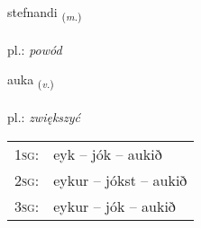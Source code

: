 \documentclass[frontgrid, backgrid]{flacards}\usepackage[]{graphicx}\usepackage[]{xcolor}
\begin{document}
{stefnandi \small{\textsubscript{(\textit{m.})}} \\[1ex] %
\textphonetic{[stɛpnantɪ]} \\
pl.: \emph{powód} \\  [2ex]
\renewcommand*{\arraystretch}{0.8}
}

\renewcommand{\flhead}{\vskip5pt \fboxsep=0pt {\small\bfseries\footnotesize Sagnorð | czasownik}}
\renewcommand{\fcfoot}{\vskip5pt \fboxsep=0pt \hspace{2pt}{\small\bfseries\footnotesize 1K}}

\renewcommand{\blhead}{\vskip5pt {\small\bfseries\footnotesize Sagnorð | czasownik }}
\renewcommand{\bcfoot}{\vskip5pt \hspace{2pt}{\small\bfseries\footnotesize 1K}}


{auka \small{\textsubscript{(\textit{v.})}} \\[1ex] %
\textphonetic{[œiːka]} \\
pl.: \emph{zwiększyć} \\  [2ex]
\renewcommand*{\arraystretch}{0.8}
\begin{tabular}{p{1cm}l}
\textsc{1sg}: & eyk -- jók -- aukið \\ 
\textsc{2sg}: & eykur -- jókst -- aukið \\ 
\textsc{3sg}: & eykur -- jók -- aukið \\ 
\end{tabular}
}

\renewcommand{\flhead}{\vskip5pt \fboxsep=0pt {\small\bfseries\footnotesize Nafnorð | rzeczownik}}
\renewcommand{\fcfoot}{\vskip5pt \fboxsep=0pt \hspace{2pt}{\small\bfseries\footnotesize 1K}}
\end{document}
